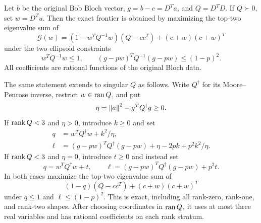 \begin{theorem}
\label{thm:r3-ellipsoid}
Let $b$ be the original Bob Bloch vector, $g=b-c=D^Ta$, and
$Q=D^TD$. If $Q\succ0$, set $w=D^Tu$. Then the exact frontier is
obtained by maximizing the top-two eigenvalue sum of
\begin{equation}
 \mathcal G(w)=
 (1-w^TQ^{-1}w)(Q-cc^T)+(c+w)(c+w)^T
 \label{eq:r3-ellipsoid-gram}
\end{equation}
under the two ellipsoid constraints
\begin{equation}
 w^TQ^{-1}w\le1,\qquad
 (g-pw)^TQ^{-1}(g-pw)\le(1-p)^2.
 \label{eq:r3-two-ellipsoids}
\end{equation}
All coefficients are rational functions of the original Bloch data.

The same statement extends to singular $Q$ as follows.
Write $Q^\dagger$ for its Moore--Penrose inverse, restrict
$w\in\operatorname{ran} Q$, and put
\[
 \eta=\left\lVert a\right\rVert^2-g^TQ^\dagger g\ge0.
\]
If $\operatorname{rank} Q<3$ and $\eta>0$, introduce $k\ge0$ and set
\begin{align}
 q&=w^TQ^\dagger w+k^2/\eta,\\
 \ell&=(g-pw)^TQ^\dagger(g-pw)
              +\eta-2pk+p^2k^2/\eta.
 \label{eq:r3-singular-positive}
\end{align}
If $\operatorname{rank} Q<3$ and $\eta=0$, introduce $t\ge0$ and instead set
\begin{equation}
 q=w^TQ^\dagger w+t,\qquad
 \ell=(g-pw)^TQ^\dagger(g-pw)+p^2t.
 \label{eq:r3-singular-zero}
\end{equation}
In both cases maximize the top-two eigenvalue sum of
\begin{equation}
 (1-q)(Q-cc^T)+(c+w)(c+w)^T
 \label{eq:r3-singular-gram}
\end{equation}
under $q\le1$ and $\ell\le(1-p)^2$.
This is exact, including all rank-zero, rank-one, and rank-two shapes.
After choosing coordinates in $\operatorname{ran} Q$, it uses at most three real
variables and has rational coefficients on each rank stratum.
\end{theorem}


